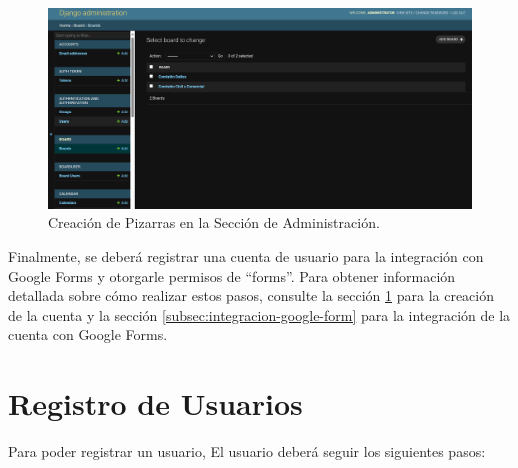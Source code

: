 \begin{figure}[H]
    \centering
    \includegraphics[width=1\linewidth]{fig/boards-admin.png}
    \caption{Creación de Pizarras en la Sección de Administración.}
    \label{fig:boards-admin}
\end{figure}

Finalmente, se deberá registrar una cuenta de usuario para la integración con Google Forms y otorgarle permisos de ``forms''. Para obtener información detallada sobre cómo realizar estos pasos, consulte la sección \ref{sec:registrar-cuenta} para la creación de la cuenta y la sección \ref{subsec:integracion-google-form} para la integración de la cuenta con Google Forms.



\section{Registro de Usuarios}\label{sec:registrar-cuenta}

Para poder registrar un usuario, El usuario deberá seguir los siguientes pasos:


